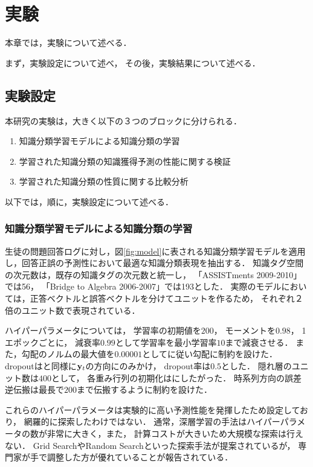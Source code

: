 \chapter{実験}
\label{chap:result}
\fancyhf{}
\rhead{\thepage}
\cfoot{\thepage}


本章では，実験について述べる．

まず，実験設定について述べ，
その後，実験結果について述べる．


\section{実験設定}

本研究の実験は，大きく以下の３つのブロックに分けられる．
\begin{enumerate}
	\item 知識分類学習モデルによる知識分類の学習
	\item 学習された知識分類の知識獲得予測の性能に関する検証
	\item 学習された知識分類の性質に関する比較分析
\end{enumerate}
以下では，順に，実験設定について述べる．


\subsection{知識分類学習モデルによる知識分類の学習}
\label{sec:section}
生徒の問題回答ログに対し，図\ref{fig:model}に表される知識分類学習モデルを適用し，回答正誤の予測性において最適な知識分類表現を抽出する．
知識タグ空間の次元数は，既存の知識タグの次元数と統一し，
「ASSISTments 2009-2010」では56，
「Bridge to Algebra 2006-2007」では193とした．
実際のモデルにおいては，正答ベクトルと誤答ベクトルを分けてユニットを作るため，
それぞれ２倍のユニット数で表現されている．

ハイパーパラメータについては，
学習率の初期値を$200$，
モーメントを$0.98$，
1エポックごとに，
減衰率$0.99$として学習率を最小学習率$10$まで減衰させる．
また，勾配のノルムの最大値を$0.00001$として\cite{pascanu2013difficulty}に従い勾配に制約を設けた．
dropoutは\cite{piech2015deep}と同様に${\bf y}_t$の方向にのみかけ，
dropout率は$0.5$とした．
隠れ層のユニット数は$400$として，
各重み行列の初期化は\cite{glorot2010understanding}にしたがった．
時系列方向の誤差逆伝搬は最長で$200$まで伝搬するように制約を設けた．

これらのハイパーパラメータは実験的に高い予測性能を発揮したため設定しており，
網羅的に探索したわけではない．
通常，深層学習の手法はハイパーパラメータの数が非常に大きく，また，
計算コストが大きいため大規模な探索は行えない．
Grid SearchやRandom Search\cite{bergstra2012random}といった探索手法が提案されているが，
専門家が手で調整した方が優れていることが報告されている\cite{larochelle2007empirical, bergstra2012random}．

